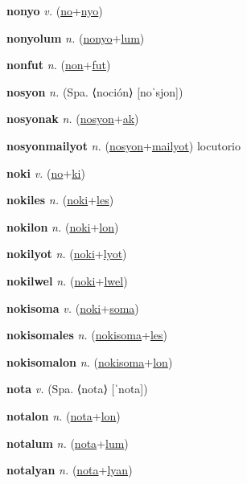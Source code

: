 \textbf{\hypertarget{nonyo}{nonyo}} \textit{v.} (\hyperlink{no}{no}+\allowbreak \hyperlink{nyo}{nyo})


\textbf{\hypertarget{nonyolum}{nonyolum}} \textit{n.} (\hyperlink{nonyo}{nonyo}+\allowbreak \hyperlink{lum}{lum})


\textbf{\hypertarget{nonfut}{nonfut}} \textit{n.} (\hyperlink{non}{non}+\allowbreak \hyperlink{fut}{fut})


\textbf{\hypertarget{nosyon}{nosyon}} \textit{n.} (Spa. ⟨noción⟩ [noˈsjon])


\textbf{\hypertarget{nosyonak}{nosyonak}} \textit{n.} (\hyperlink{nosyon}{nosyon}+\allowbreak \hyperlink{ak}{ak})


\textbf{\hypertarget{nosyonmailyot}{nosyonmailyot}} \textit{n.} (\hyperlink{nosyon}{nosyon}+\allowbreak \hyperlink{mailyot}{mailyot})
locutorio

\textbf{\hypertarget{noki}{noki}} \textit{v.} (\hyperlink{no}{no}+\allowbreak \hyperlink{ki}{ki})


\textbf{\hypertarget{nokiles}{nokiles}} \textit{n.} (\hyperlink{noki}{noki}+\allowbreak \hyperlink{les}{les})


\textbf{\hypertarget{nokilon}{nokilon}} \textit{n.} (\hyperlink{noki}{noki}+\allowbreak \hyperlink{lon}{lon})


\textbf{\hypertarget{nokilyot}{nokilyot}} \textit{n.} (\hyperlink{noki}{noki}+\allowbreak \hyperlink{lyot}{lyot})


\textbf{\hypertarget{nokilwel}{nokilwel}} \textit{n.} (\hyperlink{noki}{noki}+\allowbreak \hyperlink{lwel}{lwel})


\textbf{\hypertarget{nokisoma}{nokisoma}} \textit{v.} (\hyperlink{noki}{noki}+\allowbreak \hyperlink{soma}{soma})


\textbf{\hypertarget{nokisomales}{nokisomales}} \textit{n.} (\hyperlink{nokisoma}{nokisoma}+\allowbreak \hyperlink{les}{les})


\textbf{\hypertarget{nokisomalon}{nokisomalon}} \textit{n.} (\hyperlink{nokisoma}{nokisoma}+\allowbreak \hyperlink{lon}{lon})


\textbf{\hypertarget{nota}{nota}} \textit{v.} (Spa. ⟨nota⟩ [ˈnota])


\textbf{\hypertarget{notalon}{notalon}} \textit{n.} (\hyperlink{nota}{nota}+\allowbreak \hyperlink{lon}{lon})


\textbf{\hypertarget{notalum}{notalum}} \textit{n.} (\hyperlink{nota}{nota}+\allowbreak \hyperlink{lum}{lum})


\textbf{\hypertarget{notalyan}{notalyan}} \textit{n.} (\hyperlink{nota}{nota}+\allowbreak \hyperlink{lyan}{lyan})


